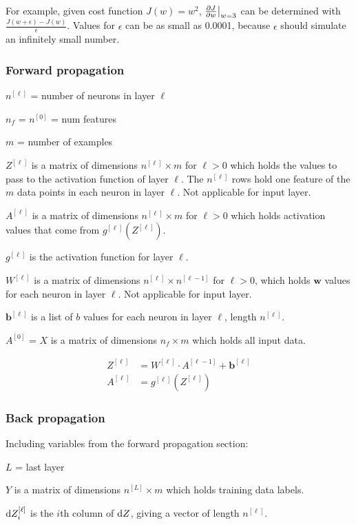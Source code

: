 \documentclass[12pt]{article}
\begin{document}
For example, given cost function $J(w) = w^2$, $\frac{\partial J}{\partial w}\big{|}_{w=3}$
can be determined with $\frac{J(w + \epsilon) - J(w)}{\epsilon}$. Values for $\epsilon$
can be as small as 0.0001, because $\epsilon$ should simulate an infinitely small number.

\subsubsection{Forward propagation}
$n^{[\ell]}$ = number of neurons in layer $\ell$

$n_f$ = $n^{[0]}$ = num features

$m$ = number of examples

$Z^{[\ell]}$ is a matrix of dimensions $n^{[\ell]} \times m$ for $\ell > 0$ which holds the values to pass
to the activation function of layer $\ell$. The $n^{[\ell]}$ rows hold one feature of the
$m$ data points in each neuron in layer $\ell$. Not applicable for input layer.

$A^{[\ell]}$ is a matrix of dimensions $n^{[\ell]} \times m$ for $\ell > 0$ which holds activation values
that come from $g^{[\ell]}(Z^{[\ell]})$.

$g^{[\ell]}$ is the activation function for layer $\ell$.

$W^{[\ell]}$ is a matrix of dimensions $n^{[\ell]} \times n^{[\ell-1]}$ for $\ell > 0$, which holds $\bm w$ values
for each neuron in layer $\ell$. Not applicable for input layer.

$\bm b^{[\ell]}$ is a list of $b$ values for each neuron in layer $\ell$, length $n^{[\ell]}$.

$A^{[0]}$ = $X$ is a matrix of dimensions $n_f \times m$ which holds all input data.

\begin{align*}
    Z^{[\ell]} &= W^{[\ell]} \cdot A^{[\ell-1]} + \bm b^{[\ell]}\\
    A^{[\ell]} &= g^{[\ell]}(Z^{[\ell]})
\end{align*}

\subsubsection{Back propagation}
Including variables from the forward propagation section:

$L$ = last layer

$Y$ is a matrix of dimensions $n^{[L]} \times m$ which holds training data labels.

$\mathop{}\!\mathrm{d} Z^{[\ell]}_i$ is the $i$th column of $\mathop{}\!\mathrm{d} Z$, giving a vector of length $n^{[\ell]}$.
\end{document}
